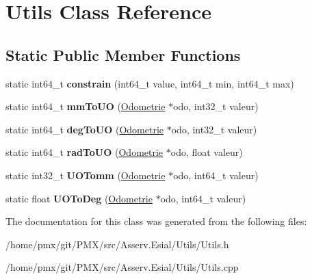 \hypertarget{classUtils}{}\section{Utils Class Reference}
\label{classUtils}
\subsection*{Static Public Member Functions}
\begin{DoxyCompactItemize}
\item 
\mbox{\label{classUtils_a685d3edc91b617915652e1116de22d86}} 
static int64\+\_\+t {\bfseries constrain} (int64\+\_\+t value, int64\+\_\+t min, int64\+\_\+t max)
\item 
\mbox{\label{classUtils_a6bc578bdb5abe75a1fedab43d909b2b6}} 
static int64\+\_\+t {\bfseries mm\+To\+UO} (\hyperlink{classOdometrie}{Odometrie} $\ast$odo, int32\+\_\+t valeur)
\item 
\mbox{\label{classUtils_a8f9e98aead350cf853e4b3b611dadd7f}} 
static int64\+\_\+t {\bfseries deg\+To\+UO} (\hyperlink{classOdometrie}{Odometrie} $\ast$odo, int32\+\_\+t valeur)
\item 
\mbox{\label{classUtils_a0a1426bec9e5084d0817526e2311f116}} 
static int64\+\_\+t {\bfseries rad\+To\+UO} (\hyperlink{classOdometrie}{Odometrie} $\ast$odo, float valeur)
\item 
\mbox{\label{classUtils_a2609842761c1ddb62fa9e06f92ad9099}} 
static int32\+\_\+t {\bfseries U\+O\+Tomm} (\hyperlink{classOdometrie}{Odometrie} $\ast$odo, int64\+\_\+t valeur)
\item 
\mbox{\label{classUtils_af6d0cc487ba8e74d699bd53e22d4ad3d}} 
static float {\bfseries U\+O\+To\+Deg} (\hyperlink{classOdometrie}{Odometrie} $\ast$odo, int64\+\_\+t valeur)
\end{DoxyCompactItemize}


The documentation for this class was generated from the following files\+:\begin{DoxyCompactItemize}
\item 
/home/pmx/git/\+P\+M\+X/src/\+Asserv.\+Esial/\+Utils/Utils.\+h\item 
/home/pmx/git/\+P\+M\+X/src/\+Asserv.\+Esial/\+Utils/Utils.\+cpp\end{DoxyCompactItemize}
